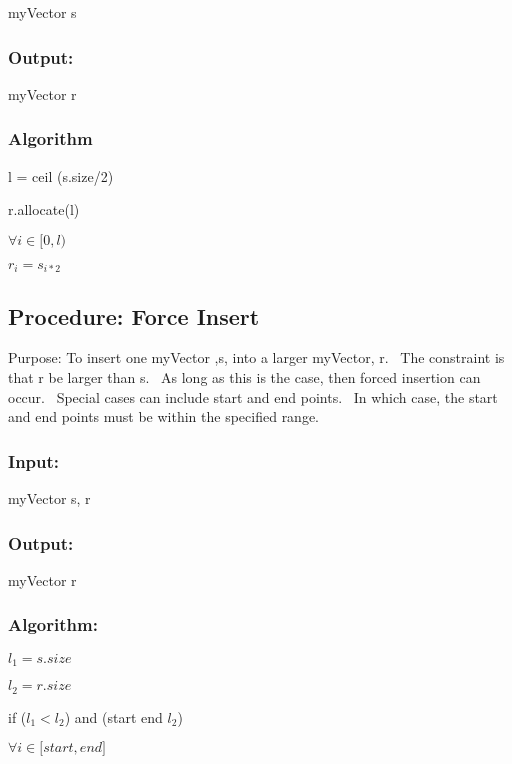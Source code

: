 \documentclass{article}
\begin{document}
\qquad myVector s

\subsubsection{Output:}

\qquad myVector r

\subsubsection{Algorithm}

\qquad l = ceil (s.size/2)

\qquad r.allocate(l)

\qquad $\forall i\in \lbrack 0,l)$

\qquad \qquad $r_{i}=s_{i\ast 2}$

\bigskip 

\bigskip 

\subsection{Procedure: Force Insert}

\bigskip Purpose: To insert one myVector ,s, into a larger myVector, r. \
The constraint is that r be larger than s. \ As long as this is the case,
then forced insertion can occur. \ Special cases can include start and end
points. \ In which case, the start and end points must be within the
specified range.

\subsubsection{Input: }

\qquad myVector s, r

\subsubsection{Output:}

\qquad myVector r

\subsubsection{Algorithm:}

\qquad $l_{1}=s.size$

\qquad $l_{2}=r.size$

\qquad if ($l_{1}<l_{2}$) and (start \TEXTsymbol{<} end \TEXTsymbol{<} $l_{2}
$)

\qquad \qquad $\forall i\in \lbrack start,end]$
\end{document}
